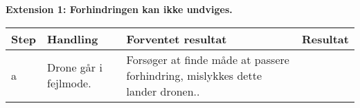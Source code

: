 \textbf{Extension 1: Forhindringen kan ikke undviges.}
\begin{table}[H]
	\centering
		\begin{tabular}{|l|p{5 cm}|p{5 cm}|p{3.5 cm}|} 
		\hline
			Step & Handling & Forventet resultat & Resultat\\ \hline
			a & Drone går i fejlmode. & Forsøger at finde måde at passere forhindring, mislykkes dette lander dronen.. & \\ \hline
		\end{tabular}
\end{table}


